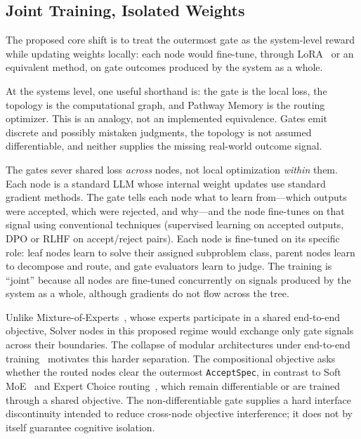 \documentclass[11pt]{article}
\let\oldtexttt\texttt
\renewcommand{\texttt}[1]{\oldtexttt{\small #1}}
\begin{document}
\subsection{Joint Training, Isolated Weights}

The proposed core shift is to treat the outermost gate as the system-level reward while updating weights locally: each node would fine-tune, through LoRA~\cite{hu2022lora} or an equivalent method, on gate outcomes produced by the system as a whole.

At the systems level, one useful shorthand is: the gate is the local loss, the topology is the computational graph, and Pathway Memory is the routing optimizer. This is an analogy, not an implemented equivalence. Gates emit discrete and possibly mistaken judgments, the topology is not assumed differentiable, and neither supplies the missing real-world outcome signal.

The gates sever shared loss \emph{across} nodes, not local optimization \emph{within} them. Each node is a standard LLM whose internal weight updates use standard gradient methods. The gate tells each node what to learn from---which outputs were accepted, which were rejected, and why---and the node fine-tunes on that signal using conventional techniques (supervised learning on accepted outputs, DPO or RLHF on accept/reject pairs). Each node is fine-tuned on its specific role: leaf nodes learn to solve their assigned subproblem class, parent nodes learn to decompose and route, and gate evaluators learn to judge. The training is ``joint'' because all nodes are fine-tuned concurrently on signals produced by the system as a whole, although gradients do not flow across the tree.

Unlike Mixture-of-Experts~\cite{jacobs1991,shazeer2017,fedus2022switch}, whose experts participate in a shared end-to-end objective, Solver nodes in this proposed regime would exchange only gate signals across their boundaries. The collapse of modular architectures under end-to-end training~\cite{mittal2022modular} motivates this harder separation. The compositional objective asks whether the routed nodes clear the outermost \texttt{AcceptSpec}, in contrast to Soft MoE~\cite{puigcerver2024soft} and Expert Choice routing~\cite{zhou2022expertchoice}, which remain differentiable or are trained through a shared objective. The non-differentiable gate supplies a hard interface discontinuity intended to reduce cross-node objective interference; it does not by itself guarantee cognitive isolation.
\end{document}
